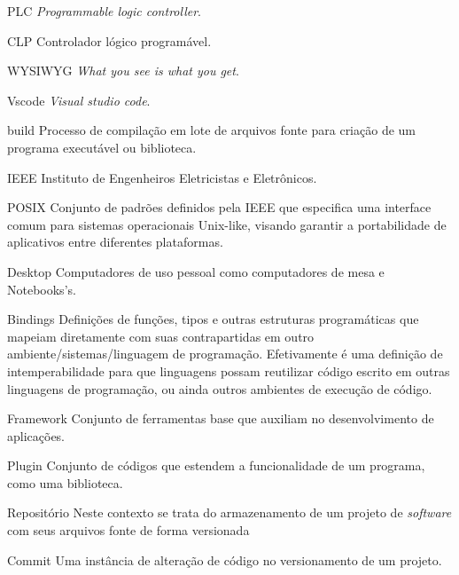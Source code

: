 \listoffigures*
\cleardoublepage


\listoflistings
\cleardoublepage

\begin{siglas}												%
    \item[PLC]               \textit{Programmable logic controller}.
    \item[CLP]               Controlador lógico programável.
    \item[WYSIWYG]           \textit{What you see is what you get}.
    \item[Vscode]            \textit{Visual studio code}.
    \item[build]             Processo de compilação em lote de arquivos fonte para criação de um programa executável ou biblioteca.
    \item[IEEE]              Instituto de Engenheiros Eletricistas e Eletrônicos.
    \item[POSIX]             Conjunto de padrões definidos pela IEEE que especifica uma interface comum para sistemas operacionais Unix-like, visando garantir a portabilidade de aplicativos entre diferentes plataformas.
    \item[Desktop]           Computadores de uso pessoal como computadores de mesa e Notebooks's.
    \item[Bindings]          Definições de funções, tipos e outras estruturas programáticas que mapeiam diretamente com suas contrapartidas em outro ambiente/sistemas/linguagem de programação. Efetivamente é uma definição de intemperabilidade para que linguagens possam reutilizar código escrito em outras linguagens de programação, ou ainda outros ambientes de execução de código.
    \item[Framework]         Conjunto de ferramentas base que auxiliam no desenvolvimento de aplicações.
    \item[Plugin]            Conjunto de códigos que estendem a funcionalidade de um programa, como uma biblioteca.
    \item[Repositório]       Neste contexto se trata do armazenamento de um projeto de \textit{software} com seus arquivos fonte de forma versionada 
    \item[Commit]            Uma instância de alteração de código no versionamento de um projeto.  

\end{siglas}
